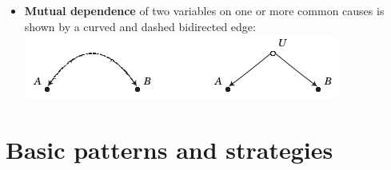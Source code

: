 \begin{itemize}
\item \textbf{Mutual dependence} of two variables on one or more common causes is shown by a curved and dashed bidirected edge:\\
\includegraphics[trim=0 -1cm 0 -1cm, center]{../material/fig-graph-shorthand-unobserved-common-cause.png}

\end{itemize}

\section*{Basic patterns and strategies}

